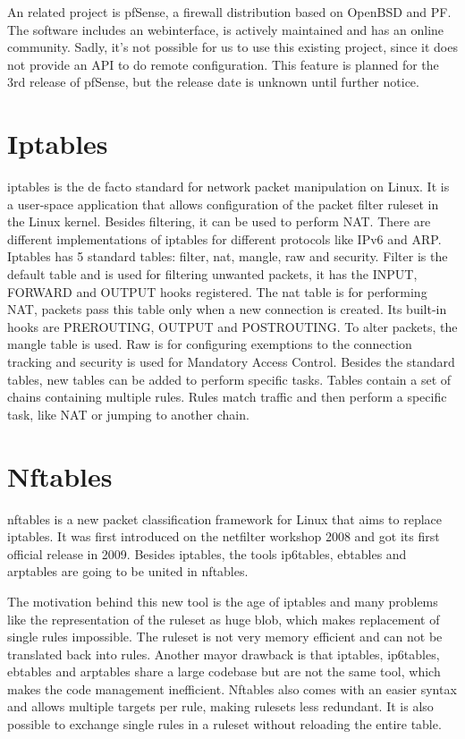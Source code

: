 \documentclass{report}
\begin{document}
An related project is pfSense\cite{pfsense}, a firewall distribution based on
OpenBSD and PF. The software includes an webinterface, is actively
maintained and has an online community. Sadly, it's not possible for us
to use this existing project, since it does not provide an API to do
remote configuration. This feature is planned for the 3rd release of
pfSense, but the release date is unknown until further notice.


\section{Iptables}\label{iptables}

iptables\cite{iptables} is the de facto standard for network packet manipulation on
Linux. It is a user-space application that allows configuration of
the packet filter ruleset in the Linux kernel. Besides filtering, it can
be used to perform NAT. There are different implementations of iptables
for different protocols like IPv6 and ARP. Iptables has 5 standard
tables: filter, nat, mangle, raw and security. Filter is the default
table and is used for filtering unwanted packets, it has the INPUT,
FORWARD and OUTPUT hooks registered. The nat table is for performing
NAT, packets pass this table only when a new connection is created. Its built-in
hooks are PREROUTING, OUTPUT and POSTROUTING. To alter
packets, the mangle table is used. Raw is for configuring exemptions to
the connection tracking and security is used for Mandatory Access
Control. Besides the standard tables, new tables can be added to perform
specific tasks. Tables contain a set of chains containing multiple rules.
Rules match traffic and then perform a specific task, like NAT or
jumping to another chain.

\section{Nftables}\label{nftables}

nftables\cite{nftables}\cite{nftables2}\cite{nftables3} is a new packet classification framework for Linux that aims to
replace iptables. It was first introduced on the netfilter workshop 2008
and got its first official release in 2009. Besides iptables, the tools
ip6tables, ebtables and arptables are going to be united in nftables.

The motivation behind this new tool is the age of iptables and many
problems like the representation of the ruleset as huge blob, which
makes replacement of single rules impossible. The ruleset is not very
memory efficient and can not be translated back into rules. Another
mayor drawback is that iptables, ip6tables, ebtables and arptables share
a large codebase but are not the same tool, which makes the code
management inefficient. Nftables also comes with an easier syntax and
allows multiple targets per rule, making rulesets less redundant. It is
also possible to exchange single rules in a ruleset without reloading
the entire table.
\end{document}
